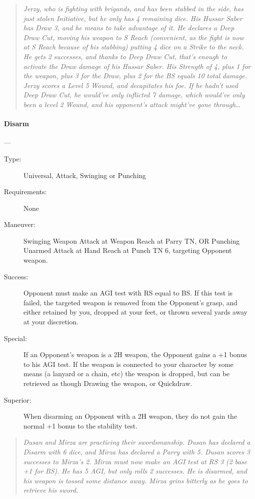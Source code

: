 \documentclass[oneside,11pt,english]{book}
\begin{document}
\begin{quotation}
\emph{Jerzy, who is fighting with brigands, and has been stabbed in the side, has just stolen Initiative, but he only has 4 remaining dice. His Hussar Saber has Draw 3, and he means to take advantage of it. He declares a Deep Draw Cut, moving his weapon to S Reach (convenient, as the fight is now at S Reach because of his stabbing) putting 4 dice on a Strike to the neck. He gets 2 successes, and thanks to Deep Draw Cut, that’s enough to activate the Draw damage of his Hussar Saber. His Strength of 4, plus 1 for the weapon, plus 3 for the Draw, plus 2 for the BS equals 10 total damage. Jerzy scores a Level 5 Wound, and decapitates his foe. If he hadn’t used Deep Draw Cut, he would’ve only inflicted 7 damage, which would’ve only been a level 2 Wound, and his opponent’s attack might’ve gone through\ldots}
\end{quotation}

\paragraph{\large\label{man:Disarm}Disarm}---\quad{\large[X+1]}
\vspace{-10pt}\begin{description}
\item [Type:] Universal, Attack, Swinging or Punching 
\item [Requirements:] None 
\item [Maneuver:] Swinging Weapon Attack at Weapon Reach at Parry TN, OR Punching Unarmed Attack at Hand Reach at Punch TN 6, targeting Opponent weapon. 
\item [Success:] Opponent must make an AGI test with RS equal to BS. If this test is failed, the targeted weapon is removed from the Opponent's grasp, and either retained by you, dropped at your feet, or thrown several yards away at your discretion.
\item [Special:] If an Opponent’s weapon is a 2H weapon, the Opponent gains a +1 bonus to his AGI test.  If the weapon is connected to your character by some means (a lanyard or a chain, etc) the weapon is dropped, but can be retrieved as though Drawing the weapon, or Quickdraw. 
\item [Superior:] When disarming an Opponent with a 2H weapon, they do not gain the normal +1 bonus to the 
stability test.
\end{description}
\begin{quotation}
\emph{Dusan and Mirza are practicing their swordsmanship. Dusan has declared a Disarm with 6 dice, and Mirza has declared a Parry with 5. Dusan scores 3 successes to Mirza’s 2. Mirza must now make an AGI test at RS 3 (2 base +1 for BS). He has 5 AGI, but only rolls 2 successes. He is disarmed, and his weapon is tossed some distance away. Mirza grins bitterly as he goes to retrieve his sword.}
\end{quotation}
\end{document}
